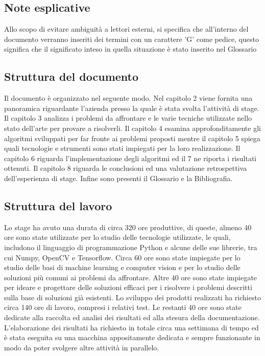 \subsection{Note esplicative}
Allo scopo di evitare ambiguità a lettori esterni, si specifica che all'interno del documento verranno inseriti dei termini con un carattere 'G' come pedice, questo significa che il significato inteso in quella situazione è stato inserito nel Glossario

\subsection{Struttura del documento}
Il documento è organizzato nel seguente modo. Nel capitolo 2 viene fornita una panoramica riguardante l'azienda presso la quale è stata svolta l'attività di stage. Il capitolo 3 analizza i problemi da affrontare e le varie tecniche utilizzate nello stato dell'arte per provare a risolverli. Il capitolo 4 esamina approfonditamente gli algoritmi sviluppati per far fronte ai problemi proposti mentre il capitolo 5 spiega quali tecnologie e strumenti sono stati impiegati per la loro realizzazione. Il capitolo 6 riguarda l'implementazione degli algoritmi ed il 7 ne riporta i risultati ottenuti. Il capitolo 8 riguarda le conclusioni ed una valutazione retrospettiva dell'esperienza di stage. Infine sono presenti il Glossario e la Bibliografia.

\subsection{Struttura del lavoro}
Lo stage ha avuto una durata di circa 320 ore produttive, di queste, almeno 40 ore sono state utilizzate per lo studio delle tecnologie utilizzate, le quali, includono il linguaggio di programmazione Python e alcune delle sue librerie, tra cui Numpy, OpenCV e Tensorflow. Circa 60 ore sono state impiegate per lo studio delle basi di machine learning e computer vision e per lo studio delle soluzioni più comuni ai problemi da affrontare. Altre 40 ore sono state impiegate per ideare e progettare delle soluzioni efficaci per i risolvere i problemi descritti sulla base di soluzioni già esistenti. Lo sviluppo dei prodotti realizzati ha richiesto circa 140 ore di lavoro, compresi i relativi test. Le restanti 40 ore sono state dedicate alla raccolta ed analisi dei risultati ed alla stesura della documentazione. L'elaborazione dei risultati ha richiesto in totale circa una settimana di tempo ed è stata eseguita su una macchina appositamente dedicata e sempre funzionante in modo da poter svolgere altre attività in parallelo.
